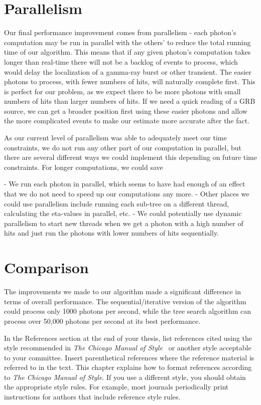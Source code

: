 \section{Parallelism}
Our final performance improvement comes from parallelism - each photon's computation may be run in parallel with the others' to reduce the total running time of our algorithm. This means that if any given photon's computation takes longer than real-time there will not be a backlog of events to process, which would delay the localization of a gamma-ray burst or other transient. The easier photons to process, with fewer numbers of hits, will naturally complete first. This is perfect for our problem, as we expect there to be more photons with small numbers of hits than larger numbers of hits. If we need a quick reading of a GRB source, we can get a broader position first using these easier photons and allow the more complicated events to make our estimate more accurate after the fact.

As our current level of parallelism was able to adequately meet our time constraints, we do not run any other part of our computation in parallel, but there are several different ways we could implement this depending on future time constraints. For longer computations, we could save 

- We run each photon in parallel, which seems to have had enough of an effect that we do not need to speed up our computations any more.
- Other places we could use parallelism include running each sub-tree on a different thread, calculating the eta-values in parallel, etc.
- We could potentially use dynamic parallelism to start new threads when we get a photon with a high number of hits and just run the photons with lower numbers of hits sequentially.

\section{Comparison}

The improvements we made to our algorithm made a significant difference in terms of overall performance. The sequential/iterative version of the algorithm could process only 1000 photons per second, while the tree search algorithm can process over 50,000 photons per second at its best performance.

\iffalse
\label{cpt:citation}

In the References section at the end of your thesis, list references cited
using the style recommended in \textit{The Chicago Manual of
Style}~\cite{ChicagoManual} or another style acceptable to your committee.
Insert parenthetical references where the reference material is referred to in
the text.  This chapter explains how to format references according to
\textit{The Chicago Manual of Style}.  If you use a different style, you should
obtain the appropriate style rules.  For example, most journals periodically
print instructions for authors that include reference style rules.

